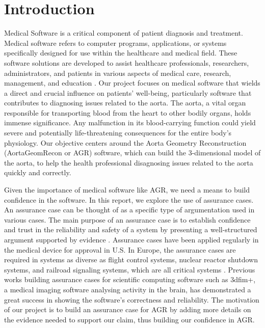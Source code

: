 \chapter{Introduction} \label{intro}

Medical Software is a critical component of patient diagnosis and treatment. Medical software refers to computer programs, applications, or systems specifically designed for use within the healthcare and medical field. These software solutions are developed to assist healthcare professionals, researchers, administrators, and patients in various aspects of medical care, research, management, and education \cite{medical_software}. Our project focuses on medical software that wields a direct and crucial influence on patients' well-being, particularly software that contributes to diagnosing issues related to the aorta. The aorta, a vital organ responsible for transporting blood from the heart to other bodily organs, holds immense significance. Any malfunction in its blood-carrying function could yield severe and potentially life-threatening consequences for the entire body's physiology. Our objective centers around the Aorta Geometry Reconstruction (AortaGeomRecon or AGR) software, which can build the 3-dimensional model of the aorta, to help the health professional disagnosing issues related to the aorta quickly and correctly.

Given the importance of medical software like AGR, we need a means to build confidence in the software. In this report, we explore the use of assurance cases. An assurance case can be thought of as a specific type of argumentation used in various cases. The main purpose of an assurance case is to establish confidence and trust in the reliability and safety of a system by presenting a well-structured argument supported by evidence \cite{Weinstock_2013}. Assurance cases have been applied regularly in the medical device for approval in U.S. In Europe, the assurance cases are required in systems as diverse as flight control systems, nuclear reactor shutdown systems, and railroad signaling systems, which are all critical systems \cite{Weinstock_2013}. Previous works \cite{scs_ac} building assurance cases for scientific computing software such as 3dfim+, a medical imaging software analysing activity in the brain, has demonstrated a great success in showing the software's correctness and reliability. The motivation of our project is to build an assurance case for AGR by adding more details on the evidence needed to support our claim, thus building our confidence in AGR.

